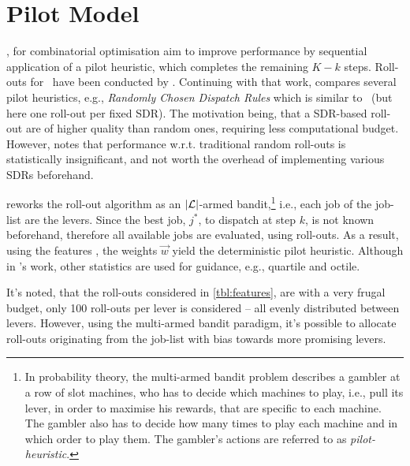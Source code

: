 
\chapter{Pilot Model}\label{ch:rollout}

\citep{Bertsekas97,Duin99}, for combinatorial optimisation aim to improve 
performance by sequential application of a pilot heuristic, which completes the 
remaining $K-k$ steps. Roll-outs for \JSP\ have been conducted by \citet{Ru12}. 
Continuing with that work, \citet{Geirsson2012} compares several pilot 
heuristics, e.g., \emph{Randomly Chosen Dispatch Rules} which is similar 
to \phiSDRRelated\ (but here one roll-out per fixed SDR). 
The motivation being, that a SDR-based roll-out are of higher quality than 
random ones, requiring less computational budget. 
However, \citeauthor{Geirsson2012} notes that performance w.r.t. traditional 
random roll-outs is statistically insignificant, and not worth the overhead of 
implementing various SDRs beforehand. 

\citeauthor{Geirsson2012} reworks the roll-out algorithm as an 
$\lvert\mathcal{L}\rvert$-armed bandit,\footnote{In probability theory, the
    multi-armed bandit problem \citep{badit:book} describes a gambler at a row 
    of slot machines, who has to decide which machines to play, i.e., pull its 
    lever, in  order to maximise his rewards, that are specific to each 
    machine. The gambler also has to decide how many times to play each machine 
    and in which order to play them. The gambler's actions are referred to as 
    \emph{pilot-heuristic}.} 
i.e., each job of the job-list are the levers. Since the best job, $j^*$, to 
dispatch at step $k$, is not known beforehand, therefore all available jobs are 
evaluated, using roll-outs. 
As a result, using the features \phiRNDRelated, the weights $\vec{w}$ yield the 
deterministic pilot heuristic. Although in \citeauthor{Geirsson2012}'s work, 
other statistics are used for guidance, e.g., quartile and octile. 

It's noted, that the roll-outs considered in \cref{tbl:features}, are with a 
very frugal budget, only 100 roll-outs per lever is considered -- all evenly 
distributed between levers. 
However, using the multi-armed bandit paradigm, it's possible to allocate 
roll-outs originating from the job-list with bias towards more promising levers.

